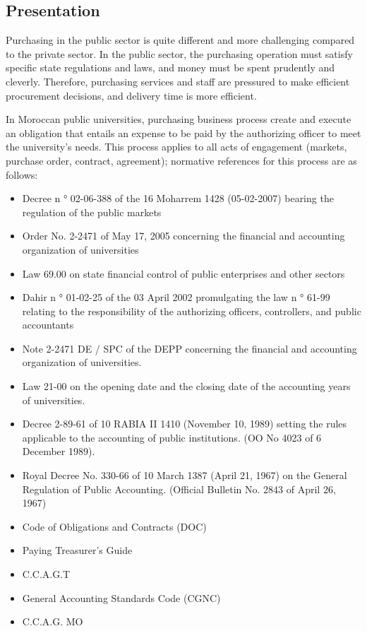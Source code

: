 \documentclass[preprint,3p,onecolumn]{elsarticle}
\begin{document}
\subsection{Presentation}
\par Purchasing in the public sector is quite different and more challenging compared to the private sector. In the public sector, the purchasing operation must satisfy specific state regulations and laws, and money must be spent prudently and cleverly. Therefore, purchasing services and staff are pressured to make efficient procurement decisions, and delivery time is more efficient. 
\par In Moroccan public universities, purchasing business process create and execute an obligation that entails an expense to be paid by the authorizing officer to meet the university’s needs. This process applies to all acts of engagement (markets, purchase order, contract, agreement); normative references for this process are as follows:
\begin{itemize}
\item Decree n ° 02-06-388 of the 16 Moharrem 1428 (05-02-2007) bearing the regulation of the public markets
\item Order No. 2-2471 of May 17, 2005 concerning the financial and accounting organization of universities
\item Law 69.00 on state financial control of public enterprises and other sectors
\item Dahir n ° 01-02-25 of the 03 April 2002 promulgating the law n ° 61-99 relating to the responsibility of the authorizing officers, controllers, and public accountants
\item Note 2-2471 DE / SPC of the DEPP concerning the financial and accounting organization of universities.
\item Law 21-00 on the opening date and the closing date of the accounting years of universities.
\item Decree 2-89-61 of 10 RABIA II 1410 (November 10, 1989) setting the rules applicable to the accounting of public institutions. (OO No 4023 of 6 December 1989).
\item Royal Decree No. 330-66 of 10 March 1387 (April 21, 1967) on the General Regulation of Public Accounting. (Official Bulletin No. 2843 of April 26, 1967)
\item Code of Obligations and Contracts (DOC)
\item Paying Treasurer's Guide
\item C.C.A.G.T
\item General Accounting Standards Code (CGNC)
\item C.C.A.G. MO
\end{itemize}
\end{document}
